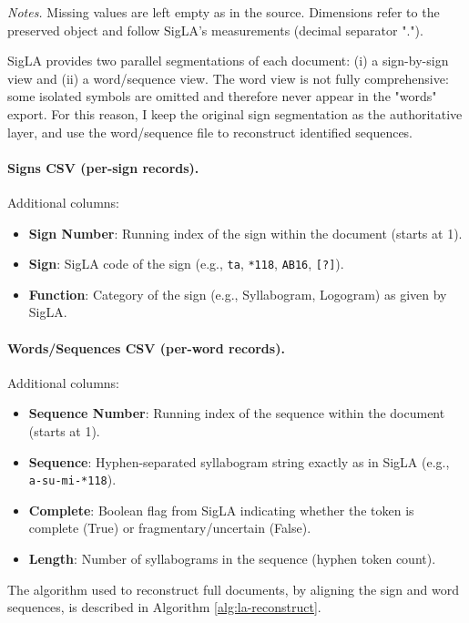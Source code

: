 \noindent\emph{Notes.} Missing values are left empty as in the source. Dimensions refer to the preserved object and follow  SigLA's measurements (decimal separator ".").

SigLA provides two parallel segmentations of each document: (i) a sign-by-sign view and (ii) a word/sequence view. The word view is not fully comprehensive: some isolated symbols are omitted and therefore never appear in the "words" export. For this reason, I keep the original sign segmentation as the authoritative layer, and use the word/sequence file to reconstruct identified sequences.

\paragraph{Signs CSV (per-sign records).}
Additional columns:

\begin{itemize}
  \item \textbf{Sign Number}: Running index of the sign within the document (starts at 1).
  \item \textbf{Sign}:  SigLA code of the sign (e.g., \texttt{ta}, \texttt{*118}, \texttt{AB16}, \texttt{[?]}).
  \item \textbf{Function}: Category of the sign (e.g., Syllabogram, Logogram) as given by  SigLA.
\end{itemize}

\paragraph{Words/Sequences CSV (per-word records).}
Additional columns:

\begin{itemize}
  \item \textbf{Sequence Number}: Running index of the sequence within the document (starts at 1).
  \item \textbf{Sequence}: Hyphen-separated syllabogram string exactly as in  SigLA (e.g., \texttt{a-su-mi-*118}).
  \item \textbf{Complete}: Boolean flag from  SigLA indicating whether the token is complete (True) or fragmentary/uncertain (False).
  \item \textbf{Length}: Number of syllabograms in the sequence (hyphen token count).
\end{itemize}

The algorithm used to reconstruct full documents, by aligning the sign and word sequences, is described in Algorithm \ref{alg:la-reconstruct}.

